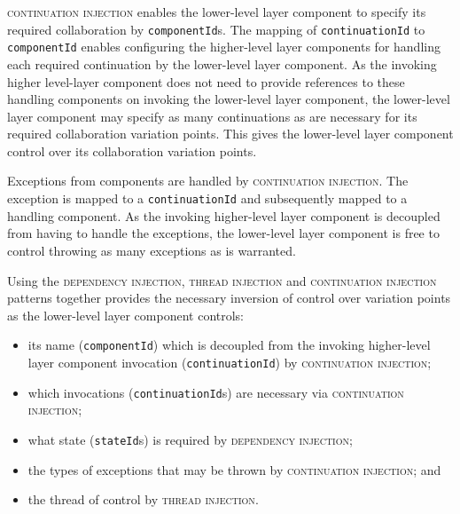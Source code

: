 \documentclass[prodmode]{style/acmlarge}
\begin{document}
\textsc{continuation injection} enables the lower-level layer component to
specify its required collaboration by \texttt{componentId}s.  The mapping of
\texttt{continuationId} to \texttt{componentId} enables configuring the
higher-level layer components for handling each required continuation by the
lower-level layer component.  As the invoking higher level-layer component does
not need to provide references to these handling components on invoking the
lower-level layer component, the lower-level layer component may specify as many
continuations as are necessary for its required collaboration variation points. 
This gives the lower-level layer component control over its collaboration
variation points.

Exceptions from components are handled by \textsc{continuation injection}.  The
exception is mapped to a \texttt{continuationId} and subsequently mapped to a
handling component.  As the  invoking higher-level layer component is decoupled
from having to handle the exceptions, the lower-level layer component is free to
control throwing as many exceptions as is warranted.

Using the \textsc{dependency injection}, \textsc{thread injection} and
\textsc{continuation injection} patterns together provides the necessary inversion
of control over variation points as the lower-level layer component controls:
\begin{itemize}
  \item its name (\texttt{componentId}) which is decoupled from the invoking higher-level layer component invocation (\texttt{contin\-uationId}) by \textsc{continuation injection};
  \item which invocations (\texttt{continuationId}s) are necessary via \textsc{continuation injection};
  \item what state (\texttt{stateId}s) is required by \textsc{dependency injection};
  \item the types of exceptions that may be thrown by \textsc{continuation injection}; and
  \item the thread of control by \textsc{thread injection}.
\end{itemize}
\end{document}
